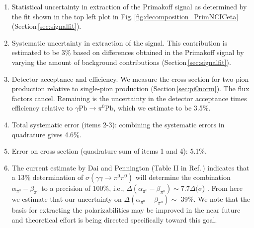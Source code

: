 \begin{enumerate}

\item
Statistical uncertainty in extraction of the Primakoff signal as determined by the fit shown in the top left plot in Fig.\,\ref{fig:decomposition_PrimNCICeta} (Section\,\ref{sec:signalfit}).


\item
Systematic uncertainty in extraction of the signal. This contribution is estimated to be 3\% based on differences obtained in the Primakoff signal by varying the amount of background contributions (Section\,\ref{sec:signalfit}).

\item 
Detector acceptance and efficiency. We measure the cross section for two-pion production relative to single-pion production (Section\,\ref{sec:pi0norm}). The flux factors cancel. Remaining is the uncertainty in the detector acceptance times efficiency relative to $\gamma \mathrm{Pb} \rightarrow \pi^0 \mathrm{Pb}$, which we estimate to be 3.5\%.

\item
Total systematic error (items 2-3): combining the systematic errors in quadrature gives 4.6\%.

\item 
Error on cross section (quadrature sum of items 1 and 4): 5.1\%.

\item
The current estimate by Dai and Pennington (Table II in Ref.\,\cite{Dai:2016ytz}) indicates
that a 13\% determination of
$\sigma(\gamma\gamma\rightarrow\pi^0\pi^0)$ will determine the
combination $\alpha_{\pi^0}-\beta_{\pi^0}$ to a precision of 100\%, i.e., $\Delta(\alpha_{\pi^0}-\beta_{\pi^0}) \sim 7.7\Delta(\sigma$) .
From here we estimate that our uncertainty on $\Delta(\alpha_{\pi^0}-\beta_{\pi^0}) \sim$ 39\%. We note that the basis for extracting the polarizabilities may be improved
in the near future and theoretical effort is being directed specifically toward this goal.

\end{enumerate}

